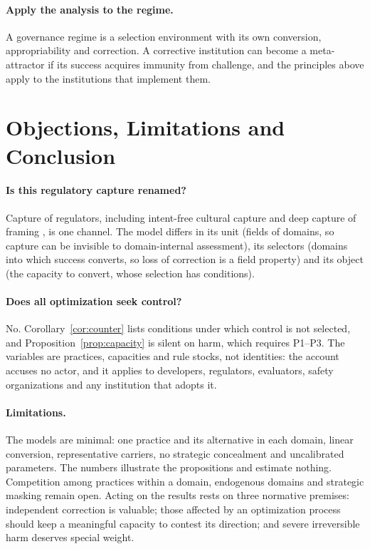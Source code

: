 \documentclass[letterpaper]{article} %
\theoremstyle{definition}
\begin{document}
\paragraph{Apply the analysis to the regime.} A governance regime is a selection environment with its own conversion, appropriability and correction. A corrective institution can become a meta-attractor if its success acquires immunity from challenge, and the principles above apply to the institutions that implement them.

\section{Objections, Limitations and Conclusion}\label{sec:objections}

\paragraph{Is this regulatory capture renamed?} Capture of regulators, including intent-free cultural capture \citep{kwak2014} and deep capture of framing \citep{hanson2003}, is one channel. The model differs in its unit (fields of domains, so capture can be invisible to domain-internal assessment), its selectors (domains into which success converts, so loss of correction is a field property) and its object (the capacity to convert, whose selection has conditions).

\paragraph{Does all optimization seek control?} No. Corollary~\ref{cor:counter} lists conditions under which control is not selected, and Proposition~\ref{prop:capacity} is silent on harm, which requires P1--P3. The variables are practices, capacities and rule stocks, not identities: the account accuses no actor, and it applies to developers, regulators, evaluators, safety organizations and any institution that adopts it.

\paragraph{Limitations.} The models are minimal: one practice and its alternative in each domain, linear conversion, representative carriers, no strategic concealment and uncalibrated parameters. The numbers illustrate the propositions and estimate nothing. Competition among practices within a domain, endogenous domains and strategic masking remain open. Acting on the results rests on three normative premises: independent correction is valuable; those affected by an optimization process should keep a meaningful capacity to contest its direction; and severe irreversible harm deserves special weight.
\end{document}
